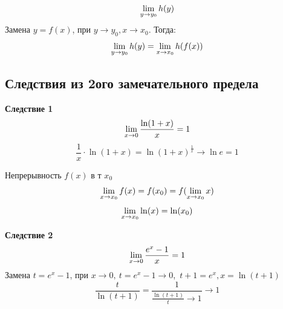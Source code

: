 \begin{remark}
	\[
		\lim\limits_{y \to y_0} h(y)
	\]
	Замена $y = f(x)$, при $y \to y_0, x \to x_0$. Тогда:
	\[
		\lim\limits_{y \to y_0} h(y) = \lim\limits_{x \to x_0} h(f(x))
	\]
\end{remark}

\subsection{Следствия из 2ого замечательного предела}

{\bf Следствие 1} 
\[
	\lim\limits_{x \to 0} \frac{\ln (1 + x)}{x} = 1
\]
\[
	\frac{1}{x} \cdot \ln (1 + x) = \ln (1 + x)^{\frac{1}{x}} \rightarrow \ln e = 1
\]

Непрерывность $f(x)$ в т $x_0$
\[
	\lim\limits_{x \to x_0} f(x) = f(x_0) = f(\lim\limits_{x \to x_0} x)
\]
\[
	\lim\limits_{x \to x_0} \ln (x) = \ln (x_0)
\]

{\bf Следствие 2}
\[
	\lim\limits_{x \to 0} \frac{e^x - 1}{x} = 1
\]
Замена $t = e^x - 1$, при $x \to 0,\ t = e^x - 1 \to 0$,\
$t + 1 = e^x, x = \ln (t + 1)$
\[
	\frac{t}{\ln (t + 1)} = \frac{1}{\frac{\ln(t + 1)}{t} \to 1} \to 1
\]

